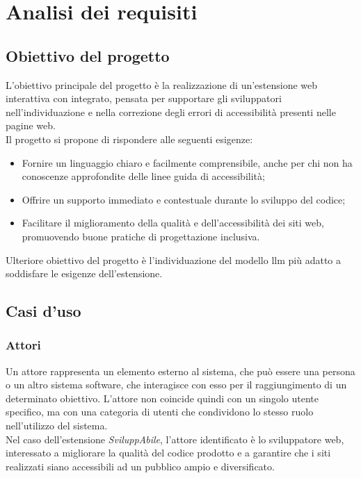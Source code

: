 \chapter{Analisi dei requisiti}
\label{chap:analisi-requisiti}

\section{Obiettivo del progetto}
\label{sec:obiettivo}
\noindent L’obiettivo principale del progetto è la realizzazione di un’estensione web interattiva con  integrato, pensata per supportare gli sviluppatori nell’individuazione e nella correzione degli errori di accessibilità presenti nelle pagine web. \\Il progetto si propone di rispondere alle seguenti esigenze:
\begin{itemize}
    \item Fornire un linguaggio chiaro e facilmente comprensibile, anche per chi non ha conoscenze approfondite delle linee guida di accessibilità;
    \item Offrire un supporto immediato e contestuale durante lo sviluppo del codice;
    \item Facilitare il miglioramento della qualità e dell’accessibilità dei siti web, promuovendo buone pratiche di progettazione inclusiva.
\end{itemize}

\noindent Ulteriore obiettivo del progetto è l’individuazione del modello \acrshort{llm} più adatto a soddisfare le esigenze dell’estensione.

\section{Casi d'uso}
\label{sec:uc}

\subsection{Attori}
\noindent Un attore rappresenta un elemento esterno al sistema, che può essere una persona o un altro sistema software, che interagisce con esso per il raggiungimento di un determinato obiettivo. L’attore non coincide quindi con un singolo utente specifico, ma con una categoria di utenti che condividono lo stesso ruolo nell’utilizzo del sistema.\\
Nel caso dell’estensione \textit{SviluppAbile}, l’attore identificato è lo sviluppatore web, interessato a migliorare la qualità del codice prodotto e a garantire che i siti realizzati siano accessibili ad un pubblico ampio e diversificato.

